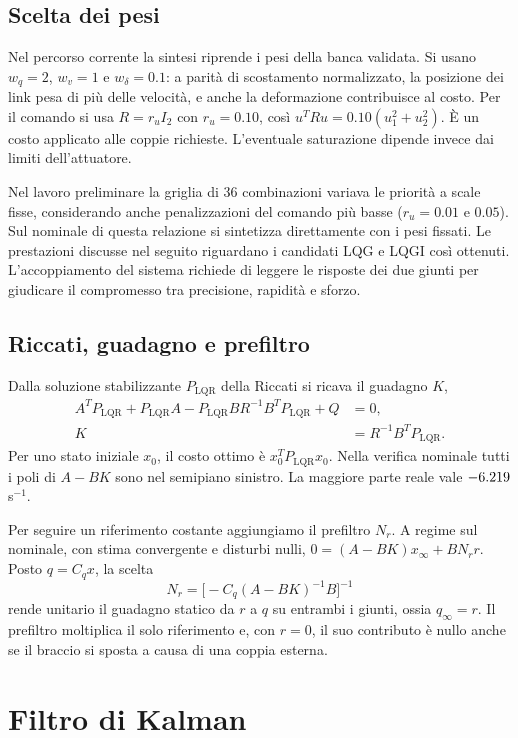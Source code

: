 \subsection{Scelta dei pesi}

Nel percorso corrente la sintesi riprende i pesi della banca validata.
Si usano $w_q=2$, $w_v=1$ e $w_\delta=0.1$: a parità di scostamento
normalizzato, la posizione dei link pesa di più delle velocità, e anche
la deformazione contribuisce al costo. Per il comando si usa
$R=r_u I_2$ con $r_u=0.10$, così $u^TRu=0.10(u_1^2+u_2^2)$.
È un costo applicato alle coppie richieste. L'eventuale saturazione
dipende invece dai limiti dell'attuatore.

Nel lavoro preliminare la griglia di 36 combinazioni variava le priorità
a scale fisse, considerando anche penalizzazioni del comando più basse
($r_u=0.01$ e $0.05$). Sul nominale di questa relazione si sintetizza
direttamente con i pesi fissati. Le prestazioni discusse nel seguito
riguardano i candidati LQG e LQGI così ottenuti. L'accoppiamento del
sistema richiede di leggere le risposte dei due giunti per giudicare il
compromesso tra precisione, rapidità e sforzo.

\subsection{Riccati, guadagno e prefiltro}

Dalla soluzione stabilizzante $P_{\mathrm{LQR}}$ della Riccati si
ricava il guadagno $K$,
\[
\begin{aligned}
A^TP_{\mathrm{LQR}}+P_{\mathrm{LQR}}A
-P_{\mathrm{LQR}}BR^{-1}B^TP_{\mathrm{LQR}}+Q&=0,\\
K&=R^{-1}B^TP_{\mathrm{LQR}}.
\end{aligned}
\]
Per uno stato iniziale $x_0$, il costo ottimo è $x_0^TP_{\mathrm{LQR}}x_0$.
Nella verifica nominale tutti i poli di $A-BK$ sono nel semipiano sinistro.
La maggiore parte reale vale $-\num{6.219}$ s$^{-1}$.

Per seguire un riferimento costante aggiungiamo il prefiltro $N_r$.
A regime sul nominale, con stima convergente e disturbi nulli,
$0=(A-BK)x_\infty+BN_rr$. Posto $q=C_qx$, la scelta
\[
N_r=\bigl[-C_q(A-BK)^{-1}B\bigr]^{-1}
\]
rende unitario il guadagno statico da $r$ a $q$ su entrambi i giunti,
ossia $q_\infty=r$. Il prefiltro moltiplica il solo riferimento e,
con $r=0$, il suo contributo è nullo anche se il braccio si sposta
a causa di una coppia esterna.

\section{Filtro di Kalman}

